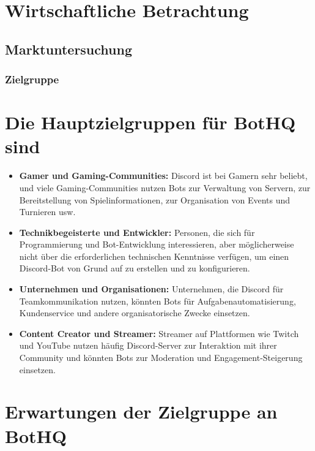 
\section{Wirtschaftliche Betrachtung}\label{wirtschaftliche-betrachtung}

\subsection{Marktuntersuchung}\label{marktuntersuchung}

\subsubsection{Zielgruppe}\label{zielgruppe}

\section{Die Hauptzielgruppen für BotHQ sind}

\begin{itemize}
  \item \textbf{Gamer und Gaming-Communities:}
  Discord ist bei Gamern sehr beliebt, und viele Gaming-Communities nutzen Bots zur Verwaltung von Servern, zur Bereitstellung von Spielinformationen, zur Organisation von Events und Turnieren usw.

  \item \textbf{Technikbegeisterte und Entwickler:}
  Personen, die sich für Programmierung und Bot-Entwicklung interessieren, aber möglicherweise nicht über die erforderlichen technischen Kenntnisse verfügen, um einen Discord-Bot von Grund auf zu erstellen und zu konfigurieren.

  \item \textbf{Unternehmen und Organisationen:}
  Unternehmen, die Discord für Teamkommunikation nutzen, könnten Bots für Aufgabenautomatisierung, Kundenservice und andere organisatorische Zwecke einsetzen.

  \item \textbf{Content Creator und Streamer:}
  Streamer auf Plattformen wie Twitch und YouTube nutzen häufig Discord-Server zur Interaktion mit ihrer Community und könnten Bots zur Moderation und Engagement-Steigerung einsetzen.
\end{itemize}

\section{Erwartungen der Zielgruppe an BotHQ}

